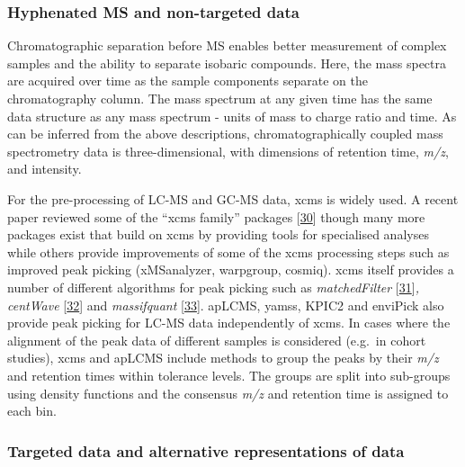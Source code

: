 \documentclass[]{article}
\begin{document}
\hypertarget{hyphenated-ms-and-non-targeted-data}{%
\subsubsection{Hyphenated MS and non-targeted data}\label{hyphenated-ms-and-non-targeted-data}}

Chromatographic separation before MS enables better measurement of complex samples and the ability to separate isobaric compounds. Here, the mass spectra are acquired over time as the sample components separate on the chromatography column. The mass spectrum at any given time has the same data structure as any mass spectrum - units of mass to charge ratio and time. As can be inferred from the above descriptions, chromatographically coupled mass spectrometry data is three-dimensional, with dimensions of retention time, \emph{m/z}, and intensity.

For the pre-processing of LC-MS and GC-MS data, xcms is widely used. A recent paper reviewed some of the ``xcms family'' packages {[}\protect\hyperlink{ref-mahieu_2016a}{30}{]} though many more packages exist that build on xcms by providing tools for specialised analyses while others provide improvements of some of the xcms processing steps such as improved peak picking (xMSanalyzer, warpgroup, cosmiq). xcms itself provides a number of different algorithms for peak picking such as \emph{matchedFilter} {[}\protect\hyperlink{ref-smith_2006}{31}{]}\emph{, centWave} {[}\protect\hyperlink{ref-tautenhahn_2008}{32}{]} and \emph{massifquant} {[}\protect\hyperlink{ref-conley_2014}{33}{]}. apLCMS, yamss, KPIC2 and enviPick also provide peak picking for LC-MS data independently of xcms. In cases where the alignment of the peak data of different samples is considered (e.g.~in cohort studies), xcms and apLCMS include methods to group the peaks by their \emph{m/z} and retention times within tolerance levels. The groups are split into sub-groups using density functions and the consensus \emph{m/z} and retention time is assigned to each bin.

\hypertarget{targeted-data-and-alternative-representations-of-data}{%
\subsubsection{Targeted data and alternative representations of data}\label{targeted-data-and-alternative-representations-of-data}}
\end{document}

